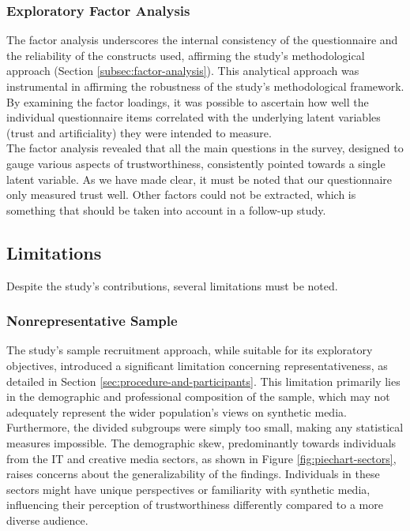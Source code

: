 \documentclass[
  a4paper,  %
  twoside,  %
  bibliography=totoc,
  headsepline,
  cleardoublepage=empty,
  parskip=half,
  draft=false
]{scrbook}
\begin{document}
\subsubsection{Exploratory Factor Analysis}
The factor analysis underscores the internal consistency of the questionnaire and the reliability of the constructs used, affirming the study's methodological approach (Section \ref{subsec:factor-analysis}). This analytical approach was instrumental in affirming the robustness of the study's methodological framework. By examining the factor loadings, it was possible to ascertain how well the individual questionnaire items correlated with the underlying latent variables (trust and artificiality) they were intended to measure. \\
The factor analysis revealed that all the main questions in the survey, designed to gauge various aspects of trustworthiness, consistently pointed towards a single latent variable. As we have made clear, it must be noted that our questionnaire only measured trust well. Other factors could not be extracted, which is something that should be taken into account in a follow-up study.

\subsection{Limitations}
\label{subsec:limitations}
Despite the study's contributions, several limitations must be noted.

\subsubsection{Nonrepresentative Sample}
The study's sample recruitment approach, while suitable for its exploratory objectives, introduced a significant limitation concerning representativeness, as detailed in Section \ref{sec:procedure-and-participants}. This limitation primarily lies in the demographic and professional composition of the sample, which may not adequately represent the wider population's views on synthetic media. Furthermore, the divided subgroups were simply too small, making any statistical measures impossible. The demographic skew, predominantly towards individuals from the IT and creative media sectors, as shown in Figure \ref{fig:piechart-sectors}, raises concerns about the generalizability of the findings. Individuals in these sectors might have unique perspectives or familiarity with synthetic media, influencing their perception of trustworthiness differently compared to a more diverse audience.
\end{document}
